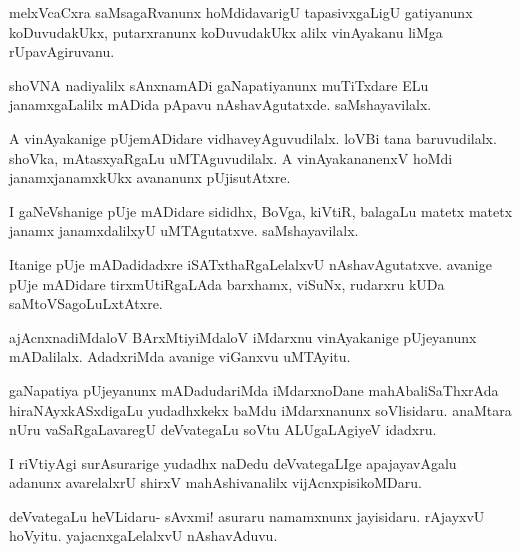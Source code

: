 \documentclass{article}
\begin{document}
\begin{mng}%
melxVcaCxra saMsagaRvanunx hoMdidavarigU tapasivxgaLigU gatiyanunx koDuvudakUkx, putarxranunx koDuvudakUkx alilx vinAyakanu liMga rUpavAgiruvanu.
\end{mng}

\begin{mng}%
shoVNA nadiyalilx sAnxnamADi gaNapatiyanunx muTiTxdare ELu janamxgaLalilx mADida pApavu nAshavAgutatxde. saMshayavilalx.
\end{mng}

\begin{mng}%
A vinAyakanige pUjemADidare vidhaveyAguvudilalx. loVBi tana baruvudilalx. shoVka, mAtasxyaRgaLu uMTAguvudilalx. A vinAyakananenxV hoMdi janamxjanamxkUkx avananunx pUjisutAtxre.
\end{mng}

\begin{mng}%
I gaNeVshanige pUje mADidare sididhx, BoVga, kiVtiR, balagaLu matetx matetx janamx janamxdalilxyU uMTAgutatxve. saMshayavilalx.
\end{mng}

\begin{mng}%
Itanige pUje mADadidadxre iSATxthaRgaLelalxvU nAshavAgutatxve. avanige pUje mADidare tirxmUtiRgaLAda barxhamx, viSuNx, rudarxru kUDa saMtoVSagoLuLxtAtxre.
\end{mng}

\begin{mng}%
ajAcnxnadiMdaloV BArxMtiyiMdaloV iMdarxnu vinAyakanige pUjeyanunx mADalilalx. AdadxriMda avanige viGanxvu uMTAyitu.
\end{mng}

\begin{mng}%
gaNapatiya pUjeyanunx mADadudariMda iMdarxnoDane mahAbaliSaThxrAda hiraNAyxkASxdigaLu yudadhxkekx baMdu iMdarxnanunx soVlisidaru. anaMtara nUru vaSaRgaLavaregU deVvategaLu soVtu ALUgaLAgiyeV idadxru.
\end{mng}

\begin{mng}%
I riVtiyAgi surAsurarige yudadhx naDedu deVvategaLIge apajayavAgalu adanunx avarelalxrU shirxV mahAshivanalilx vijAcnxpisikoMDaru.
\end{mng}

\begin{mng}%
deVvategaLu heVLidaru- sAvxmi! asuraru namamxnunx jayisidaru. rAjayxvU hoVyitu. yajacnxgaLelalxvU nAshavAduvu.
\end{mng}
\end{document}
